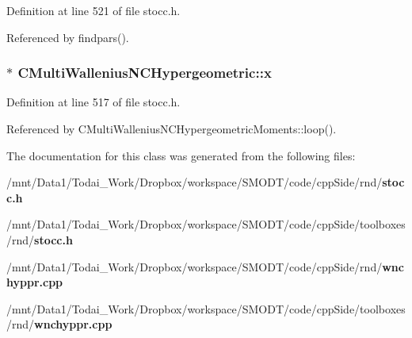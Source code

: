 Definition at line 521 of file stocc.\-h.



Referenced by findpars().

\subsubsection[{x}]{ $\ast$ C\-Multi\-Wallenius\-N\-C\-Hypergeometric\-::x\hspace{0.3cm}{\ttfamily [protected]}}\label{class_c_multi_wallenius_n_c_hypergeometric_ae4e4bd1bd6ffec0956195da6cf893f76}


Definition at line 517 of file stocc.\-h.



Referenced by C\-Multi\-Wallenius\-N\-C\-Hypergeometric\-Moments\-::loop().



The documentation for this class was generated from the following files\-:\begin{DoxyCompactItemize}
\item 
/mnt/\-Data1/\-Todai\-\_\-\-Work/\-Dropbox/workspace/\-S\-M\-O\-D\-T/code/cpp\-Side/rnd/{\bf stocc.\-h}\item 
/mnt/\-Data1/\-Todai\-\_\-\-Work/\-Dropbox/workspace/\-S\-M\-O\-D\-T/code/cpp\-Side/toolboxes/rnd/{\bf stocc.\-h}\item 
/mnt/\-Data1/\-Todai\-\_\-\-Work/\-Dropbox/workspace/\-S\-M\-O\-D\-T/code/cpp\-Side/rnd/{\bf wnchyppr.\-cpp}\item 
/mnt/\-Data1/\-Todai\-\_\-\-Work/\-Dropbox/workspace/\-S\-M\-O\-D\-T/code/cpp\-Side/toolboxes/rnd/{\bf wnchyppr.\-cpp}\end{DoxyCompactItemize}
